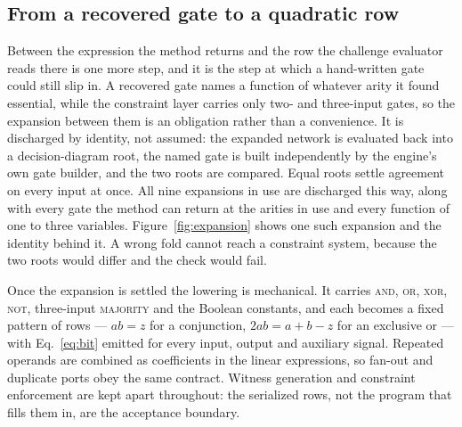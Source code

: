 \documentclass[11pt,a4paper]{article}
\begin{document}
\subsection{From a recovered gate to a quadratic row}
Between the expression the method returns and the row the challenge evaluator
reads there is one more step, and it is the step at which a hand-written gate
could still slip in. A recovered gate names a function of whatever arity it
found essential, while the constraint layer carries only two- and three-input
gates, so the expansion between them is an obligation rather than a
convenience. It is discharged by identity, not assumed: the expanded network is
evaluated back into a decision-diagram root, the named gate is built
independently by the engine's own gate builder, and the two roots are compared.
Equal roots settle agreement on every input at once. All nine expansions in use
are discharged this way, along with every gate the method can return at the
arities in use and every function of one to three variables.
Figure~\ref{fig:expansion} shows one such expansion and the identity behind it.
A wrong fold cannot reach a constraint system, because the two roots would
differ and the check would fail.

Once the expansion is settled the lowering is mechanical. It carries
\textsc{and}, \textsc{or}, \textsc{xor}, \textsc{not}, three-input
\textsc{majority} and the Boolean constants, and each becomes a fixed pattern of
rows --- $ab=z$ for a conjunction, $2ab=a+b-z$ for an exclusive or --- with
Eq.~\eqref{eq:bit} emitted for every input, output and auxiliary signal.
Repeated operands are combined as coefficients in the linear expressions, so
fan-out and duplicate ports obey the same contract. Witness generation and
constraint enforcement are kept apart throughout: the serialized rows, not the
program that fills them in, are the acceptance boundary.
\end{document}
